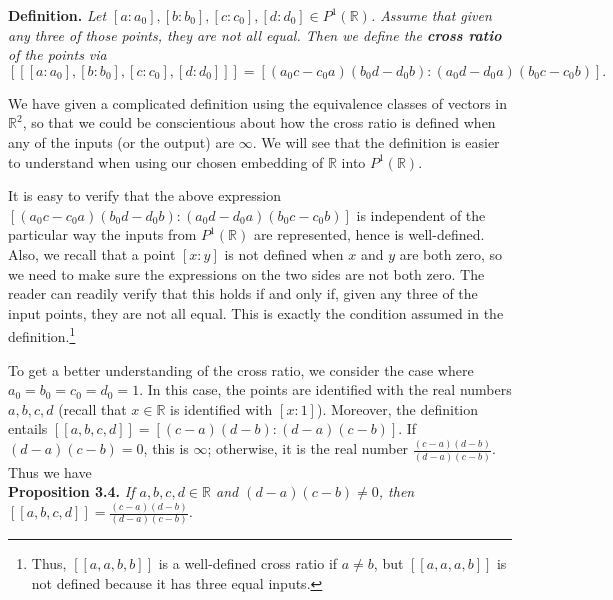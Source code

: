 \documentclass[leqno]{book}
\begin{document}
\noindent\textbf{Definition.} \emph{Let $[a:a_0],[b:b_0],[c:c_0],[d:d_0]\in P^1(\mathbb R)$.  Assume that given any three of those points, they are not all equal.  Then we define the \textbf{cross ratio} of the points via}
$$[\![[a:a_0],[b:b_0],[c:c_0],[d:d_0]]\!]=[(a_0c-c_0a)(b_0d-d_0b):(a_0d-d_0a)(b_0c-c_0b)].$$

\noindent We have given a complicated definition using the equivalence classes of vectors in $\mathbb R^2$, so that we could be conscientious about how the cross ratio is defined when any of the inputs (or the output) are $\infty$.  We will see that the definition is easier to understand when using our chosen embedding of $\mathbb R$ into $P^1(\mathbb R)$.

It is easy to verify that the above expression $[(a_0c-c_0a)(b_0d-d_0b):(a_0d-d_0a)(b_0c-c_0b)]$ is independent of the particular way the inputs from $P^1(\mathbb R)$ are represented, hence is well-defined.  Also, we recall that a point $[x:y]$ is not defined when $x$ and $y$ are both zero, so we need to make sure the expressions on the two sides are not both zero.  The reader can readily verify that this holds if and only if, given any three of the input points, they are not all equal.  This is exactly the condition assumed in the definition.\footnote{Thus, $[\![a,a,b,b]\!]$ is a well-defined cross ratio if $a\ne b$, but $[\![a,a,a,b]\!]$ is not defined because it has three equal inputs.} %

To get a better understanding of the cross ratio, we consider the case where $a_0=b_0=c_0=d_0=1$.  In this case, the points are identified with the real numbers $a,b,c,d$ (recall that $x\in\mathbb R$ is identified with $[x:1]$).  Moreover, the definition entails $[\![a,b,c,d]\!]=[(c-a)(d-b):(d-a)(c-b)]$.  If $(d-a)(c-b)=0$, this is $\infty$; otherwise, it is the real number $\frac{(c-a)(d-b)}{(d-a)(c-b)}$.  Thus we have\\

\noindent\textbf{Proposition 3.4.} \emph{If $a,b,c,d\in\mathbb R$ and $(d-a)(c-b)\ne 0$, then $[\![a,b,c,d]\!]=\frac{(c-a)(d-b)}{(d-a)(c-b)}$.}\\
\end{document}
